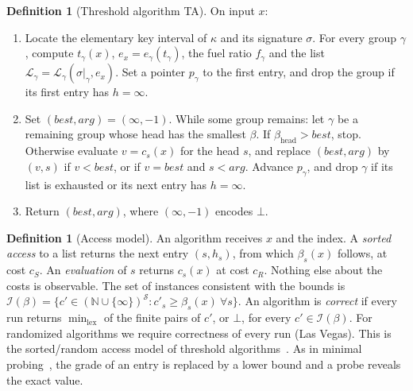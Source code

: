 \documentclass[11pt]{article}
\theoremstyle{definition}
\newtheorem{definition}[theorem]{Definition}
\theoremstyle{remark}
\newcommand{\SC}{\mathcal S}
\begin{document}
\begin{definition}[Threshold algorithm TA]\label{def:TA}
On input $x$:
\begin{enumerate}[leftmargin=*]
\item Locate the elementary key interval of $\kappa$ and its signature $\sigma$. For every
group $\gamma$, compute $t_\gamma(x)$, $e_x=e_\gamma(t_\gamma)$, the fuel ratio $f_\gamma$ and the
list $\mathcal L_\gamma=\mathcal L_\gamma(\sigma|_\gamma,e_x)$. Set a pointer $p_\gamma$ to the first
entry, and drop the group if its first entry has $h=\infty$.
\item Set $(\mathit{best},\mathit{arg})=(\infty,-1)$. While some group remains: let $\gamma$ be
a remaining group whose head has the smallest $\beta$. If $\beta_{\mathrm{head}}>\mathit{best}$,
stop. Otherwise evaluate $v=c_s(x)$ for the head $s$, and replace
$(\mathit{best},\mathit{arg})$ by $(v,s)$ if $v<\mathit{best}$, or if $v=\mathit{best}$ and
$s<\mathit{arg}$. Advance $p_\gamma$, and drop $\gamma$ if its list is exhausted or its next
entry has $h=\infty$.
\item Return $(\mathit{best},\mathit{arg})$, where $(\infty,-1)$ encodes $\bot$.
\end{enumerate}
\end{definition}

\begin{definition}[Access model]\label{def:access}
An algorithm receives $x$ and the index. A \emph{sorted access} to a list returns the next
entry $(s,h_s)$, from which $\beta_s(x)$ follows, at cost $c_S$. An \emph{evaluation} of $s$
returns $c_s(x)$ at cost $c_R$. Nothing else about the costs is observable. The set of
instances consistent with the bounds is
$\mathcal I(\beta)=\{c'\in(\mathbb N\cup\{\infty\})^{\SC}: c'_s\ge\beta_s(x)\ \forall s\}$. An
algorithm is \emph{correct} if every run returns $\min_{\mathrm{lex}}$ of the finite pairs of
$c'$, or $\bot$, for every $c'\in\mathcal I(\beta)$. For randomized algorithms we require
correctness of every run (Las Vegas). This is the sorted/random access model of threshold
algorithms~\cite{fagin2003optimal}. As in minimal probing~\cite{chang2002minimal}, the
grade of an entry is replaced by a lower bound and a probe reveals the exact value.
\end{definition}
\end{document}
